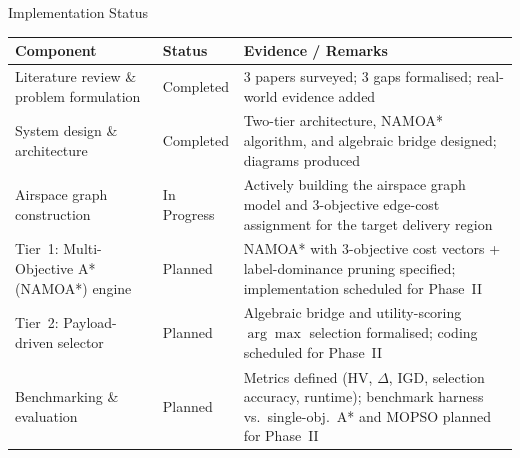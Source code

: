 \documentclass[aspectratio=169,11pt]{beamer}
\begin{document}
\begin{frame}{Implementation Status}
  \scriptsize
  \renewcommand{\arraystretch}{1.0}
  \begin{tabularx}{\textwidth}{Y>{\centering\arraybackslash}p{2.3cm}Y}
    \toprule
    \textbf{Component} & \textbf{Status} & \textbf{Evidence / Remarks}\\
    \midrule
    Literature review \& problem formulation &
      Completed &
      3 papers surveyed; 3 gaps formalised; real-world evidence added\\
    System design \& architecture &
      Completed &
      Two-tier architecture, NAMOA* algorithm, and algebraic bridge
      designed; diagrams produced\\
    Airspace graph construction &
      In Progress &
      Actively building the airspace graph model and 3-objective edge-cost
      assignment for the target delivery region\\
    Tier~1: Multi-Objective A* (NAMOA*) engine &
      Planned &
      NAMOA* with 3-objective cost vectors + label-dominance pruning
      specified; implementation scheduled for Phase~II\\
    Tier~2: Payload-driven selector &
      Planned &
      Algebraic bridge and utility-scoring $\arg\max$ selection formalised;
      coding scheduled for Phase~II\\
    Benchmarking \& evaluation &
      Planned &
      Metrics defined (HV, $\Delta$, IGD, selection accuracy, runtime);
      benchmark harness vs.\ single-obj.\ A* and MOPSO planned for Phase~II\\
    \bottomrule
  \end{tabularx}
\end{frame}
\end{document}
